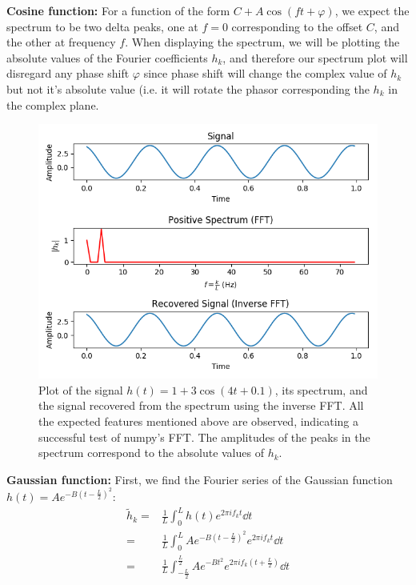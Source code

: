 \documentclass[11pt]{article}
\begin{document}
\begin{enumerate}
	\textbf{Cosine function:} For a function of the form $C + A \cos (ft+\varphi)$, we expect the spectrum to be two delta peaks, one at $f=0$ corresponding to the offset $C$, and the other at frequency $f$. When displaying the spectrum, we will be plotting the absolute values of the Fourier coefficients $h_k$, and therefore our spectrum plot will disregard any phase shift $\varphi$ since phase shift will change the complex value of $h_k$ but not it's absolute value (i.e. it will rotate the phasor corresponding the $h_k$ in the complex plane.
	
\begin{figure}[htp]
\centering
\includegraphics[scale=1.00]{cosine_signal.png}
\caption{Plot of the signal $h(t)=1 + 3 \cos (4t+0.1)$, its spectrum, and the signal recovered from the spectrum using the inverse FFT. All the expected features mentioned above are observed, indicating a successful test of numpy's FFT. The amplitudes of the peaks in the spectrum correspond to the absolute values of $h_k$.}
\label{cos_signal}
\end{figure}
	\newpage
	\textbf{Gaussian function:} First, we find the Fourier series of the Gaussian function $h(t) = A e^{-B(t-\frac{L}{2})^2}$:
	\begin{align}
	\tilde h_k =& \frac{1}{L} \int_0^L h(t) e^{2 \pi i f_{k} t} \dd{t} \\
	=& \frac{1}{L} \int_0^L A e^{-B(t-\frac{L}{2})^2} e^{2 \pi i f_{k} t} \dd{t} \\
	=& \frac{1}{L} \int_{-\frac{L}{2}}^{\frac{L}{2}} A e^{-Bt^2} e^{2 \pi i f_k (t + \frac{L}{2})} \dd{t} \\

\end{align}
\end{enumerate}
\end{document}
